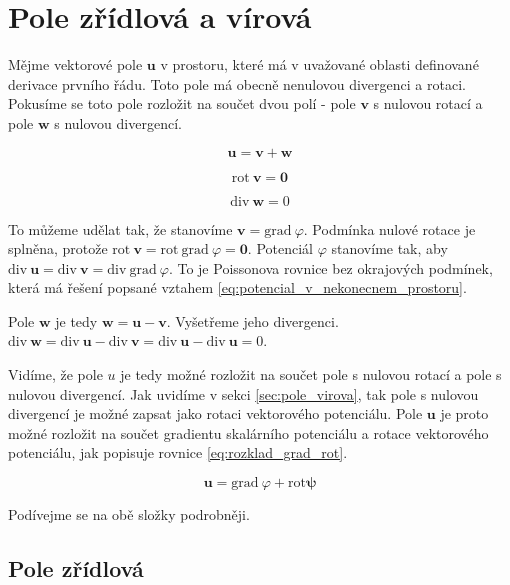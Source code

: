 \documentclass{book}
\newcommand{\vect}[1]{\boldsymbol{#1}}
\newcommand{\grad}{\mathrm{grad}}
\newcommand{\diverg}{\mathrm{div}}
\newcommand{\rot}{\mathrm{rot}}
\begin{document}
\section{Pole zřídlová a vírová}

Mějme vektorové pole \(\vect{u}\) v prostoru, které má v uvažované oblasti definované derivace prvního řádu. Toto pole má obecně nenulovou divergenci a rotaci.
Pokusíme se toto pole rozložit na součet dvou polí - pole \(\vect{v}\) s nulovou rotací a pole \(\vect{w}\) s nulovou divergencí.

\begin{equation}
\vect{u} = \vect{v} + \vect{w}
\end{equation}

\begin{equation}
\rot \ \vect{v} = \vect{0}
\end{equation}

\begin{equation}
\diverg \ \vect{w} = 0
\end{equation}

To můžeme udělat tak, že stanovíme \(\vect{v} = \grad \ \varphi\). Podmínka nulové rotace je splněna, protože \(\rot \ \vect{v} = \rot \ \grad \ \varphi = \vect{0}\).
Potenciál \(\varphi\) stanovíme tak, aby \(\diverg \ \vect{u} = \diverg \ \vect{v} = \diverg \ \grad \ \varphi\). To je Poissonova rovnice bez okrajových podmínek, která má řešení popsané vztahem \eqref{eq:potencial_v_nekonecnem_prostoru}.

Pole \(\vect{w}\) je tedy \(\vect{w} = \vect{u} - \vect{v}\). Vyšetřeme jeho divergenci. \(\diverg \ \vect{w} = \diverg \ \vect{u} - \diverg \ \vect{v} = \diverg \ \vect{u} - \diverg \ \vect{u} = 0\).

Vidíme, že pole \(u\) je tedy možné rozložit na součet pole s nulovou rotací a pole s nulovou divergencí. Jak uvidíme v sekci \ref{sec:pole_virova}, tak pole
s nulovou divergencí je možné zapsat jako rotaci vektorového potenciálu. Pole \(\vect{u}\) je proto možné rozložit na součet gradientu skalárního potenciálu
a rotace vektorového potenciálu, jak popisuje rovnice \eqref{eq:rozklad_grad_rot}.

\begin{equation}
\label{eq:rozklad_grad_rot}
\vect{u} = \grad \ \varphi + \rot \vect{\psi}
\end{equation}

Podívejme se na obě složky podrobněji.

\subsection{Pole zřídlová}
\end{document}
